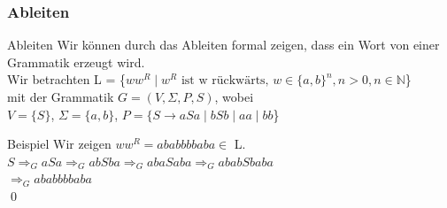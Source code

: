 \subsubsection{Ableiten}
\begin{frame}[fragile]{Ableiten}
    Wir können durch das Ableiten formal zeigen, dass ein Wort von einer Grammatik erzeugt wird.\\
    \small{Wir betrachten L = \{$ww^R \mid w^R\text{ ist w rückwärts, }w \in \{a, b\}^n, n>0, n\in \mathbb{N}$\}\\
        mit der Grammatik $G=(V,\Sigma,P,S)$, wobei\\
        $V=\{S\}$, $\Sigma=\{a,b\}$, $P = \{S \rightarrow aSa \mid bSb \mid aa \mid bb$\}}
    \begin{exampleblock}{Beispiel}
        Wir zeigen $ww^R = ababbbbaba \in$ L.\\
        \small{$S\Rightarrow_G aSa \Rightarrow_G abSba \Rightarrow_G  abaSaba \Rightarrow_G ababSbaba$ \\ $\Rightarrow_G ababbbbaba$}\\\qed
    \end{exampleblock}
\end{frame}

